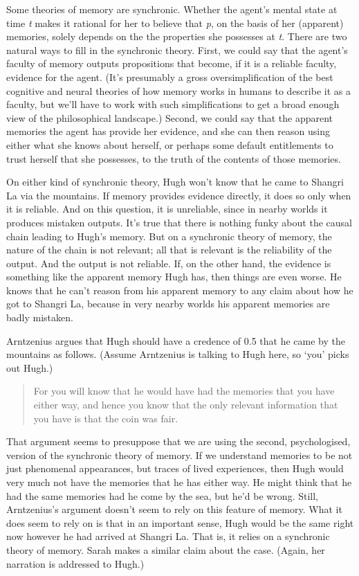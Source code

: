 Some theories of memory are synchronic. Whether the agent's mental state at time \emph{t} makes it rational for her to believe that \emph{p}, on the basis of her (apparent) memories, solely depends on the the properties she possesses at \emph{t}. There are two natural ways to fill in the synchronic theory. First, we could say that the agent's faculty of memory outputs propositions that become, if it is a reliable faculty, evidence for the agent. (It's presumably a gross oversimplification of the best cognitive and neural theories of how memory works in humans to describe it as a faculty, but we'll have to work with such simplifications to get a broad enough view of the philosophical landscape.) Second, we could say that the apparent memories the agent has provide her evidence, and she can then reason using either what she knows about herself, or perhaps some default entitlements to trust herself that she possesses, to the truth of the contents of those memories.

On either kind of synchronic theory, \gls{Hugh} won't know that he came to Shangri La via the mountains. If memory provides evidence directly, it does so only when it is reliable. And on this question, it is unreliable, since in nearby worlds it produces mistaken outputs. It's true that there is nothing funky about the causal chain leading to \gls{Hugh}'s memory. But on a synchronic theory of memory, the nature of the chain is not relevant; all that is relevant is the reliability of the output. And the output is not reliable. If, on the other hand, the evidence is something like the apparent memory \gls{Hugh} has, then things are even worse. He knows that he can't reason from his apparent memory to any claim about how he got to Shangri La, because in very nearby worlds his apparent memories are badly mistaken.

Arntzenius argues that \gls{Hugh} should have a credence of 0.5 that he came by the mountains as follows. (Assume Arntzenius is talking to Hugh here, so `you' picks out Hugh.)

\begin{quote}
For you will know that he would have had the memories that you have either way, and hence you know that the only relevant information that you have is that the coin was fair. ~\citep[356]{Arntzenius2003}
\end{quote}
That argument seems to presuppose that we are using the second, psychologised, version of the synchronic theory of memory. If we understand memories to be not just phenomenal appearances, but traces of lived experiences, then \gls{Hugh} would very much not have the memories that he has either way. He might think that he had the same memories had he come by the sea, but he'd be wrong. Still, Arntzenius's argument doesn't seem to rely on this feature of memory. What it does seem to rely on is that in an important sense, \gls{Hugh} would be the same right now however he had arrived at Shangri La. That is, it relies on a synchronic theory of memory. Sarah \citet{Moss2012} makes a similar claim about the case. (Again, her narration is addressed to Hugh.)

